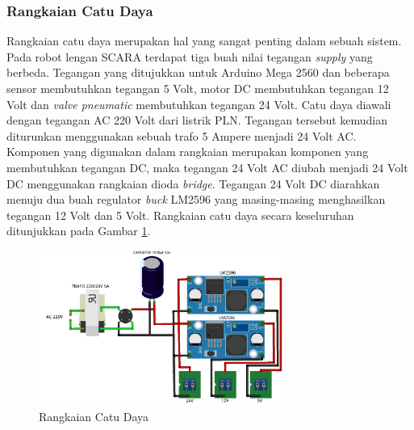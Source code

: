 \subsubsection{Rangkaian Catu Daya}
Rangkaian catu daya merupakan hal yang sangat penting dalam sebuah sistem. Pada robot lengan SCARA terdapat tiga buah nilai tegangan \textit{supply} yang berbeda. Tegangan yang ditujukkan untuk Arduino Mega 2560 dan beberapa sensor membutuhkan tegangan 5 Volt, motor DC membutuhkan tegangan 12 Volt dan \textit{valve pneumatic} membutuhkan tegangan 24 Volt. Catu daya diawali dengan tegangan AC 220 Volt dari listrik PLN. Tegangan tersebut kemudian diturunkan menggunakan sebuah trafo 5 Ampere menjadi 24 Volt AC. Komponen yang digunakan dalam rangkaian merupakan komponen yang membutuhkan tegangan DC, maka tegangan 24 Volt AC diubah menjadi 24 Volt DC menggunakan rangkaian dioda \textit{bridge}. Tegangan 24 Volt DC diarahkan menuju dua buah regulator \textit{buck} LM2596 yang masing-masing menghasilkan tegangan 12 Volt dan 5 Volt. Rangkaian catu daya secara keseluruhan ditunjukkan pada Gambar \ref{pic.skematikcatu}.
\begin{figure}[H]
	\centering
	\includegraphics[width=8cm]{gambar/catudaya_bb.png}
	\caption{Rangkaian Catu Daya}
	\label{pic.skematikcatu}
\end{figure}
